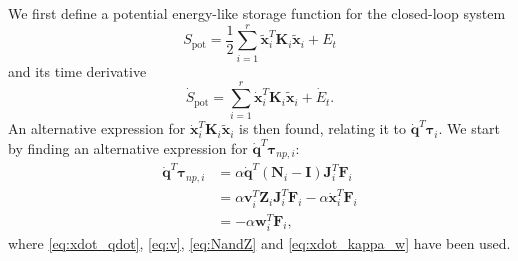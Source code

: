 \documentclass[../main.tex]{subfiles}
\begin{document}
We first define a potential energy-like storage function for the closed-loop system
\begin{equation}
    S_{\mathrm{pot}} = \frac{1}{2}\sum_{i=1}^r\tilde{\bm{x}}_{i}^T\bm{K}_{i}\tilde{\bm{x}}_{i} + E_{t}
\end{equation}
and its time derivative
\begin{equation} \label{eq:S_pot_dot}
    \dot{S}_{\mathrm{pot}} = \sum_{i=1}^r \dot{\bm{x}}_{i}^T\bm{K}_{i}\tilde{\bm{x}}_{i} + \dot{E}_{t}.
\end{equation}
An alternative expression for $\dot{\bm{x}}_{i}^T\bm{K}_{i}\tilde{\bm{x}}_{i}$ is then found, relating it to $\dot{\bm{q}}^T\bm{\tau}_i$. We start by finding an alternative expression for $\dot{\bm{q}}^T\bm{\tau}_{np,i}$:
\begin{equation}\label{eq:qdot_tauNP} 
    \begin{aligned}
        \dot{\bm{q}}^T\bm{\tau}_{np,i}  %
         & = \alpha\dot{\bm{q}}^T(\bm{N}_{i}-\bm{I}) \bm{J}_{i}^T\bm{F}_{i} \\
         & =\alpha\bm{v}_{i}^T\bm{Z}_{i}\bm{J}_{i}^T\bm{F}_{i} - \alpha\dot{\bm{x}}_{i}^T\bm{F}_{i} \\
         & = -\alpha\bm{w}_{i}^T\bm{F}_{i},
    \end{aligned}
\end{equation}
where \eqref{eq:xdot_qdot}, \eqref{eq:v}, \eqref{eq:NandZ} and \eqref{eq:xdot_kappa_w} have been used. 
\end{document}
